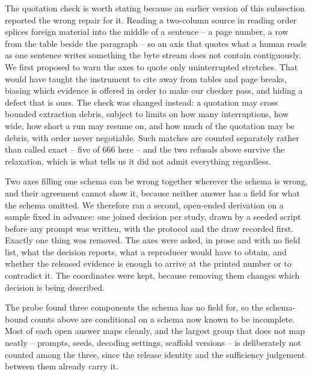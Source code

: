 The quotation check is worth stating because an earlier version of this subsection reported the
wrong repair for it. Reading a two-column source in reading order splices foreign material into
the middle of a sentence -- a page number, a row from the table beside the paragraph -- so an
axis that quotes what a human reads as one sentence writes something the byte stream does not
contain contiguously. We first proposed to warn the axes to quote only uninterrupted stretches.
That would have taught the instrument to cite away from tables and page breaks, biasing which
evidence is offered in order to make our checker pass, and hiding a defect that is ours. The
check was changed instead: a quotation may cross bounded extraction debris, subject to limits on
how many interruptions, how wide, how short a run may resume on, and how much of the quotation
may be debris, with order never negotiable. Such matches are counted separately rather than
called exact -- five of 666 here -- and the two refusals above survive the relaxation, which is
what tells us it did not admit everything regardless.

Two axes filling one schema can be wrong together wherever the schema is wrong, and their
agreement cannot show it, because neither answer has a field for what the schema omitted. We
therefore ran a second, open-ended derivation on a sample fixed in advance: one joined
decision per study, drawn by a seeded script before any prompt was written, with the protocol
and the draw recorded first. Exactly one thing was removed. The axes were asked, in prose and
with no field list, what the decision reports, what a reproducer would have to obtain, and
whether the released evidence is enough to arrive at the printed number or to contradict it.
The coordinates were kept, because removing them changes which decision is being described.

The probe found three components the schema has no field for, so the schema-bound counts above
are conditional on a schema now known to be incomplete. Most of each open answer maps cleanly,
and the largest group that does not map neatly -- prompts, seeds, decoding settings, scaffold
versions -- is deliberately not counted among the three, since the release identity and the
sufficiency judgement between them already carry it.

